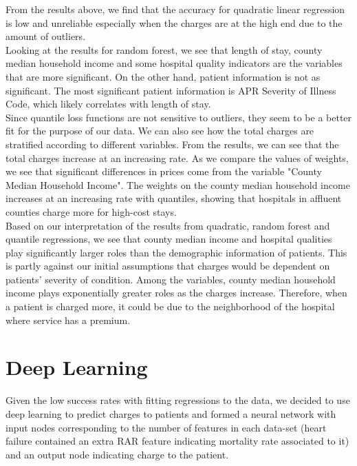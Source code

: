\documentclass[letterpaper,11pt]{article}
\begin{document}
From the results above, we find that the accuracy for quadratic linear regression is low and unreliable especially when the charges are at the high end due to the amount of outliers. \\


Looking at the results for random forest, we see that length of stay, county median household income and some hospital quality indicators are the variables that are more significant. On the other hand, patient information is not as significant. The most significant patient information is APR Severity of Illness Code, which likely correlates with length of stay. \\


Since quantile loss functions are not sensitive to outliers, they seem to be a better fit for the purpose of our data. We can also see how the total charges are stratified according to different variables. From the results, we can see that the total charges increase at an increasing rate. As we compare the values of weights, we see that significant differences in prices come from the variable "County Median Household Income". The weights on the county median household income increases at an increasing rate with quantiles, showing that hospitals in affluent counties charge more for high-cost stays. \\

Based on our interpretation of the results from quadratic, random forest and quantile regressions, we see that county median income and hospital qualities play significantly larger roles than the demographic information of patients. This is partly against our initial assumptions that charges would be dependent on patients' severity of condition. Among the variables, county median household income plays exponentially greater roles as the charges increase. Therefore, when a patient is charged more, it could be due to the neighborhood of the hospital where service has a premium.  

\section*{Deep Learning} 

Given the low success rates with fitting regressions to the data, we decided to use deep learning to predict charges to patients and formed a neural network with input nodes corresponding to the number of features in each data-set (heart failure contained an extra RAR feature indicating mortality rate associated to it) and an output node indicating charge to the patient.\\
\end{document}
